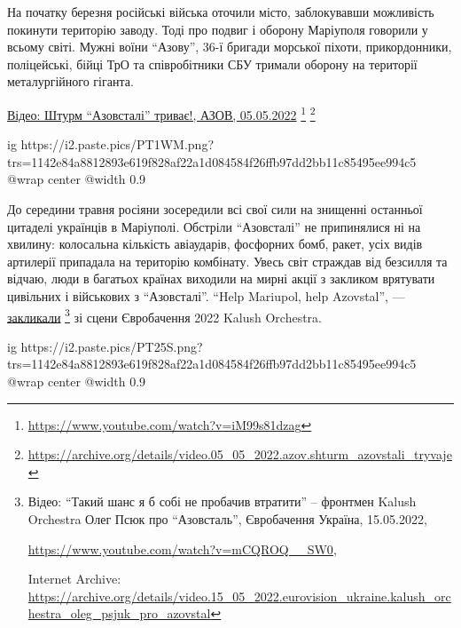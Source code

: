 На початку березня російські війська оточили місто, заблокувавши можливість
покинути територію заводу. Тоді про подвиг і оборону Маріуполя говорили у
всьому світі. Мужні воїни \enquote{Азову}, 36-ї бригади морської піхоти, прикордонники,
поліцейські, бійці ТрО та співробітники СБУ тримали оборону на території
металургійного гіганта.

\href{https://archive.org/details/video.05_05_2022.azov.shturm_azovstali_tryvaje}{%
Відео: Штурм \enquote{Азовсталі} триває!, АЗОВ, 05.05.2022}%
\footnote{\url{https://www.youtube.com/watch?v=iM99s81dzag}} %
\footnote{\url{https://archive.org/details/video.05_05_2022.azov.shturm_azovstali_tryvaje}}

\ifcmt
  ig https://i2.paste.pics/PT1WM.png?trs=1142e84a8812893e619f828af22a1d084584f26ffb97dd2bb11c85495ee994c5
  @wrap center
  @width 0.9
\fi

До середини травня росіяни зосередили всі свої сили на знищенні останньої
цитаделі українців в Маріуполі. Обстріли \enquote{Азовсталі} не припинялися ні на
хвилину: колосальна кількість авіаударів, фосфорних бомб, ракет, усіх видів
артилерії припадала на територію комбінату. Увесь світ страждав від безсилля та
відчаю, люди в багатьох країнах виходили на мирні акції з закликом врятувати
цивільних і військових з \enquote{Азовсталі}. \enquote{Help Mariupol, help Azovstal}, —
\href{https://archive.org/details/video.15_05_2022.eurovision_ukraine.kalush_orchestra_oleg_psjuk_pro_azovstal}{закликали} 
\footnote{Відео: \enquote{Такий шанс я б собі не пробачив втратити} – фронтмен Kalush Orchestra Олег Псюк про \enquote{Азовсталь}, Євробачення Україна, 15.05.2022, \par%
\url{https://www.youtube.com/watch?v=mCQROQ__SW0}, \par%
Internet Archive: \url{https://archive.org/details/video.15_05_2022.eurovision_ukraine.kalush_orchestra_oleg_psjuk_pro_azovstal}}
зі сцени Євробачення 2022 Kalush Orchestra.

\ifcmt
  ig https://i2.paste.pics/PT25S.png?trs=1142e84a8812893e619f828af22a1d084584f26ffb97dd2bb11c85495ee994c5
  @wrap center
  @width 0.9
\fi


